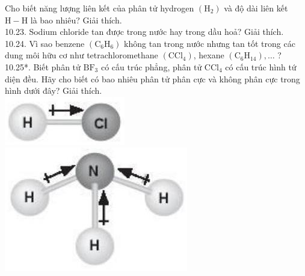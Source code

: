 \documentclass[10pt]{article}
\begin{document}
Cho biết năng lượng liên kết của phân tử hydrogen $\left(\mathrm{H}_{2}\right)$ và độ dài liên kết $\mathrm{H}-\mathrm{H}$ là bao nhiêu? Giải thích.\\
10.23. Sodium chloride tan được trong nước hay trong dầu hoả? Giải thích.\\
10.24. Vì sao benzene $\left(\mathrm{C}_{6} \mathrm{H}_{6}\right)$ không tan trong nước nhưng tan tốt trong các dung môi hữu cơ như tetrachloromethane $\left(\mathrm{CCl}_{4}\right)$, hexane $\left(\mathrm{C}_{6} \mathrm{H}_{14}\right), \ldots$ ?\\
10.25*. Biết phân tử $\mathrm{BF}_{3}$ có cấu trúc phẳng, phân tử $\mathrm{CCl}_{4}$ có cấu trúc hình tứ diện đều. Hãy cho biết có bao nhiêu phân tử phân cực và không phân cực trong hình dưới đây? Giải thích.\\
\includegraphics[max width=\textwidth, center]{2025_10_23_883c4b146e2332109fcdg-32(1)}\\
\includegraphics[max width=\textwidth, center]{2025_10_23_883c4b146e2332109fcdg-32(4)}\\
\end{document}
